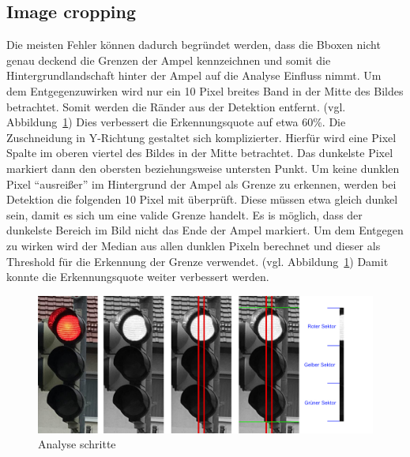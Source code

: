 \documentclass[a4paper,oneside,12pt]{report}
\begin{document}
\begin{onehalfspace}
		\section{Image cropping}
		Die meisten Fehler können dadurch begründet werden, dass die Bboxen nicht genau deckend die Grenzen der Ampel kennzeichnen und somit die Hintergrundlandschaft hinter der Ampel auf die Analyse Einfluss nimmt. Um dem Entgegenzuwirken wird nur ein 10 Pixel breites Band in der Mitte des Bildes betrachtet. Somit werden die Ränder aus der Detektion entfernt. (vgl. Abbildung~\ref{fig:TLCrop}) \newline
		Dies verbessert die Erkennungsquote auf etwa 60\%.\newline
		Die Zuschneidung in Y-Richtung gestaltet sich komplizierter. Hierfür wird eine Pixel Spalte im oberen viertel des Bildes in der Mitte betrachtet. Das dunkelste Pixel markiert dann den obersten beziehungsweise untersten Punkt. Um keine dunklen Pixel "`ausreißer"' im Hintergrund der Ampel als Grenze zu erkennen, werden bei Detektion die folgenden 10 Pixel mit überprüft. Diese müssen etwa gleich dunkel sein, damit es sich um eine valide Grenze handelt. Es is möglich, dass der dunkelste Bereich im Bild nicht das Ende der Ampel markiert. Um dem Entgegen zu wirken wird der Median aus allen dunklen Pixeln berechnet und dieser als Threshold für die Erkennung der Grenze verwendet. (vgl. Abbildung~\ref{fig:TLCrop}) Damit konnte die Erkennungsquote weiter verbessert werden.\newline
		\begin{figure}[h!]
			\includegraphics[width=\linewidth]{TLCropping.jpg}
			\caption{Analyse schritte}
			\label{fig:TLCrop}
		\end{figure}

\end{onehalfspace}
\end{document}
